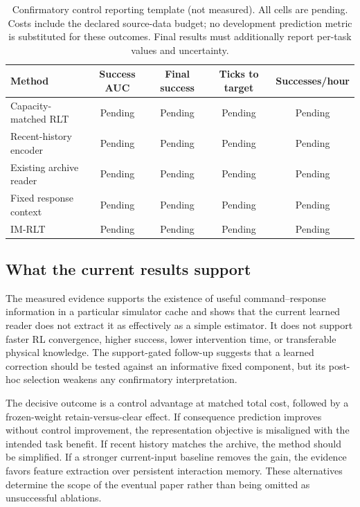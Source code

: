 \documentclass[10pt,letterpaper]{article}
\begin{document}
\begin{table}[t]
\centering\small
\caption{Confirmatory control reporting template (not measured). All cells are pending. Costs include the declared source-data budget; no development prediction metric is substituted for these outcomes. Final results must additionally report per-task values and uncertainty.}
\label{tab:pending}
\begin{tabularx}{\linewidth}{@{}Ycccc@{}}
\toprule
Method & Success AUC & Final success & Ticks to target & Successes/hour \\
\midrule
Capacity-matched RLT & Pending & Pending & Pending & Pending \\
Recent-history encoder & Pending & Pending & Pending & Pending \\
Existing archive reader & Pending & Pending & Pending & Pending \\
Fixed response context & Pending & Pending & Pending & Pending \\
IM-RLT & Pending & Pending & Pending & Pending \\
\bottomrule
\end{tabularx}
\end{table}

\subsection{What the current results support}
The measured evidence supports the existence of useful command--response information in a particular simulator cache and shows that the current learned reader does not extract it as effectively as a simple estimator. It does not support faster RL convergence, higher success, lower intervention time, or transferable physical knowledge. The support-gated follow-up suggests that a learned correction should be tested against an informative fixed component, but its post-hoc selection weakens any confirmatory interpretation.

The decisive outcome is a control advantage at matched total cost, followed by a frozen-weight retain-versus-clear effect. If consequence prediction improves without control improvement, the representation objective is misaligned with the intended task benefit. If recent history matches the archive, the method should be simplified. If a stronger current-input baseline removes the gain, the evidence favors feature extraction over persistent interaction memory. These alternatives determine the scope of the eventual paper rather than being omitted as unsuccessful ablations.
\end{document}
